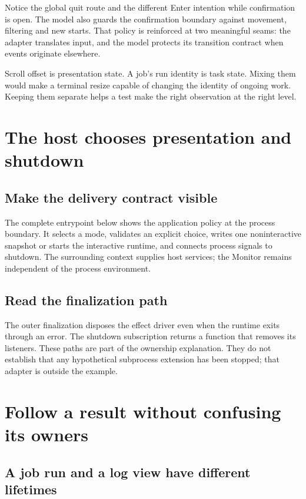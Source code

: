 Notice the global quit route and the different Enter intention while confirmation is open. The model also guards the confirmation boundary against movement, filtering and new starts. That policy is reinforced at two meaningful seams: the adapter translates input, and the model protects its transition contract when events originate elsewhere.

Scroll offset is presentation state. A job's run identity is task state. Mixing them would make a terminal resize capable of changing the identity of ongoing work. Keeping them separate helps a test make the right observation at the right level.

\section{The host chooses presentation and shutdown}
\subsection{Make the delivery contract visible}

The complete entrypoint below shows the application policy at the process boundary. It selects a mode, validates an explicit choice, writes one noninteractive snapshot or starts the interactive runtime, and connects process signals to shutdown. The surrounding context supplies host services; the Monitor remains independent of the process environment.


\subsection{Read the finalization path}

The outer finalization disposes the effect driver even when the runtime exits through an error. The shutdown subscription returns a function that removes its listeners. These paths are part of the ownership explanation. They do not establish that any hypothetical subprocess extension has been stopped; that adapter is outside the example.

\section{Follow a result without confusing its owners}
\subsection{A job run and a log view have different lifetimes}

